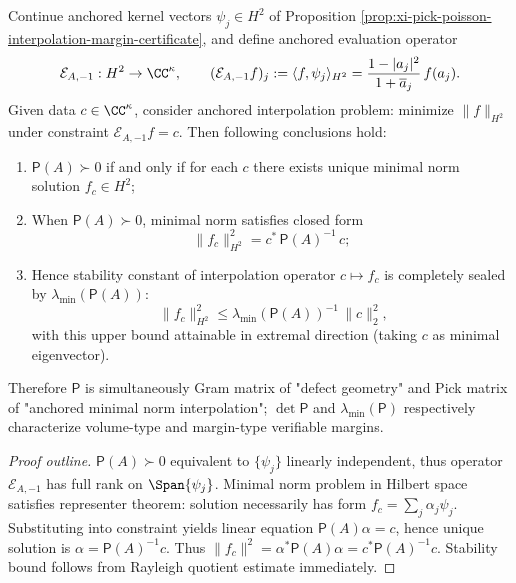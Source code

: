 \begin{proposition}\label{prop:xi-anchored-hardy-interpolation-pick-equivalence}
Continue anchored kernel vectors \(\psi_j\in H^2\) of Proposition \ref{prop:xi-pick-poisson-interpolation-margin-certificate}, and define anchored evaluation operator
\[
\mathcal{E}_{A,-1}:H^2\to\CC^{\kappa},
\qquad
(\mathcal{E}_{A,-1}f)_j:=\langle f,\psi_j\rangle_{H^2}
=\frac{1-|a_j|^2}{1+\overline a_j}\,f(a_j).
\]
Given data \(c\in\CC^{\kappa}\), consider anchored interpolation problem: minimize \(\|f\|_{H^2}\) under constraint \(\mathcal{E}_{A,-1}f=c\).
Then following conclusions hold:
\begin{enumerate}
  \item \(\mathsf P(A)\succ 0\) if and only if for each \(c\) there exists unique minimal norm solution \(f_c\in H^2\);
  \item When \(\mathsf P(A)\succ 0\), minimal norm satisfies closed form
  \[
  \boxed{\;
  \|f_c\|_{H^2}^2=c^\ast\,\mathsf P(A)^{-1}\,c;\;}
  \]
  \item Hence stability constant of interpolation operator \(c\mapsto f_c\) is completely sealed by \(\lambda_{\min}(\mathsf P(A))\):
  \[
  \boxed{\;
  \|f_c\|_{H^2}^2\le \lambda_{\min}(\mathsf P(A))^{-1}\,\|c\|_2^2,}
  \]
  with this upper bound attainable in extremal direction (taking \(c\) as minimal eigenvector).
\end{enumerate}
Therefore \(\mathsf P\) is simultaneously Gram matrix of "defect geometry" and Pick matrix of "anchored minimal norm interpolation"; \(\det\mathsf P\) and \(\lambda_{\min}(\mathsf P)\) respectively characterize volume-type and margin-type verifiable margins.
\end{proposition}
\begin{proof}[Proof outline]
\(\mathsf P(A)\succ 0\) equivalent to \(\{\psi_j\}\) linearly independent, thus operator \(\mathcal{E}_{A,-1}\) has full rank on \(\Span\{\psi_j\}\).
Minimal norm problem in Hilbert space satisfies representer theorem: solution necessarily has form \(f_c=\sum_j \alpha_j\psi_j\).
Substituting into constraint yields linear equation \(\mathsf P(A)\alpha=c\), hence unique solution is \(\alpha=\mathsf P(A)^{-1}c\).
Thus
\(
\|f_c\|^2=\alpha^\ast \mathsf P(A)\alpha=c^\ast\mathsf P(A)^{-1}c
\).
Stability bound follows from Rayleigh quotient estimate immediately.
\end{proof}

